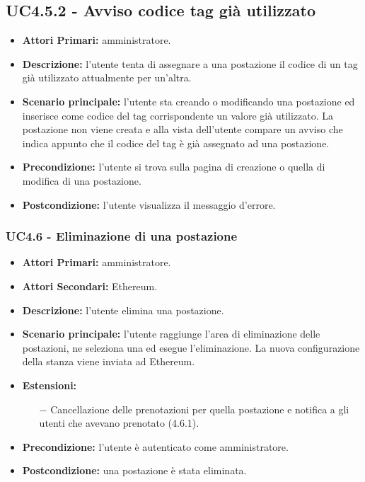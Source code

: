 \subsection{UC4.5.2 - Avviso codice tag già utilizzato}
\begin{itemize}
	\item\textbf{Attori Primari:}
	amministratore.
	\item\textbf{Descrizione:}
	l'utente tenta di assegnare a una postazione il codice di un tag già utilizzato attualmente per un'altra.
	\item\textbf{Scenario principale:}
	l'utente sta creando o modificando una postazione ed inserisce come codice del tag corrispondente un valore già utilizzato.
	La postazione non viene creata e alla vista dell'utente compare un avviso che indica appunto che il codice del tag è già assegnato ad una postazione.
	\item\textbf{Precondizione:}
	l'utente si trova sulla pagina di creazione o quella di modifica di una postazione.
	\item\textbf{Postcondizione:}
	l'utente visualizza il messaggio d'errore.
\end{itemize}

\subsubsection{UC4.6 - Eliminazione di una postazione}
\begin{itemize}
	\item\textbf{Attori Primari:}
	amministratore.
	\item\textbf{Attori Secondari:}
	Ethereum.
	\item\textbf{Descrizione:}
	l'utente elimina una postazione.
	\item\textbf{Scenario principale:} 
	l'utente raggiunge l'area di eliminazione delle postazioni, ne seleziona una ed esegue l'eliminazione. La nuova configurazione della stanza viene inviata ad Ethereum.
	\item\textbf{Estensioni:}
	\begin{itemize}
		\item[$-$] Cancellazione delle prenotazioni per quella postazione e notifica a gli utenti che avevano prenotato (4.6.1).
	\end{itemize}
	\item\textbf{Precondizione:} 
	l'utente è autenticato come amministratore.
	\item\textbf{Postcondizione:}
	una postazione è stata eliminata.
\end{itemize}


